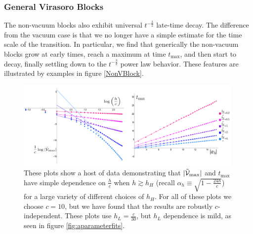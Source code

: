 \subsubsection{General Virasoro Blocks}

The non-vacuum blocks also exhibit universal $t^{-\frac{3}{2}}$ late-time decay. The difference from the vacuum case is that we no longer have a simple estimate for the time scale of the transition. In particular, we find that generically the non-vacuum blocks grow at early times, reach a maximum at time $t_{\max}$, and then start to  decay, finally settling down to the $t^{-\frac{3}{2}}$ power law behavior. These features are illustrated by examples in figure \ref{NonVBlock}. 

\begin{figure}[h]
\begin{centering}
\includegraphics[width=0.99\textwidth]{virasoro_chapter/LotsofDataforMaxandTime}
\caption[Size and location of peaks in Virasoro blocks as functions of $h_H$]{These plots show a host of data demonstrating that $|\tilde {{\cal V}}_{\max}|$ and $t_{\max}$ have simple dependence on $\frac{h}{c}$ when $h \gtrsim h_H$ (recall $\alpha_h \equiv \sqrt{1 - \frac{24h}{c}}$) for a large variety of different choices of $h_H$.  For all of these plots we choose $c=10$, but we have found that the results are robustly $c$-independent.  These plots use $h_L = \frac{c}{30}$, but $h_L$ dependence is mild, as seen in figure \ref{fig:aparameterfits}.  }
\label{fig:LotsofDataforMaxandTime}
\end{centering}
\end{figure}

